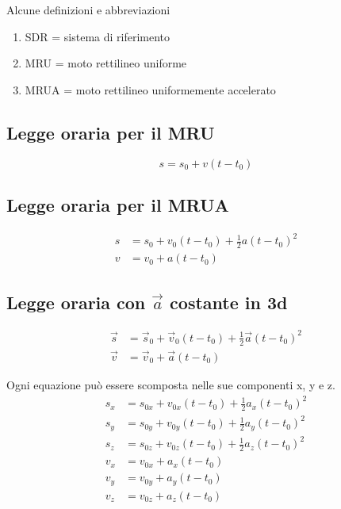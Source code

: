 \documentclass{article}
\begin{document}
Alcune definizioni e abbreviazioni
\begin{enumerate}
  \item SDR = sistema di riferimento
  \item MRU = moto rettilineo uniforme
  \item MRUA = moto rettilineo uniformemente accelerato
\end{enumerate}

\subsection*{Legge oraria per il MRU}
\begin{equation}
  s = s_0 + v (t-t_0)
\end{equation}

\subsection*{Legge oraria per il MRUA}
\begin{align}
  s &= s_0 + v_0 (t-t_0) + \frac{1}{2} a (t-t_0)^2 \\
  v &= v_0 + a (t-t_0)
\end{align}

\subsection*{Legge oraria con $\Vec{a}$ costante in 3d}
\begin{align}
  \Vec{s} &= \Vec{s}_0 + \Vec{v}_0 (t-t_0) + \frac{1}{2} \Vec{a} (t-t_0)^2 \\
  \Vec{v} &= \Vec{v}_0 + \Vec{a} (t-t_0)
\end{align}

Ogni equazione può essere scomposta nelle sue componenti x, y e z.
\begin{align}
  s_x &= s_{0x} + v_{0x} (t-t_0) + \frac{1}{2} a_x (t-t_0)^2 \\
  s_y &= s_{0y} + v_{0y} (t-t_0) + \frac{1}{2} a_y (t-t_0)^2 \\
  s_z &= s_{0z} + v_{0z} (t-t_0) + \frac{1}{2} a_z (t-t_0)^2 \\
  v_x &= v_{0x} + a_x (t-t_0) \\
  v_y &= v_{0y} + a_y (t-t_0) \\
  v_z &= v_{0z} + a_z (t-t_0)
\end{align}
\end{document}
